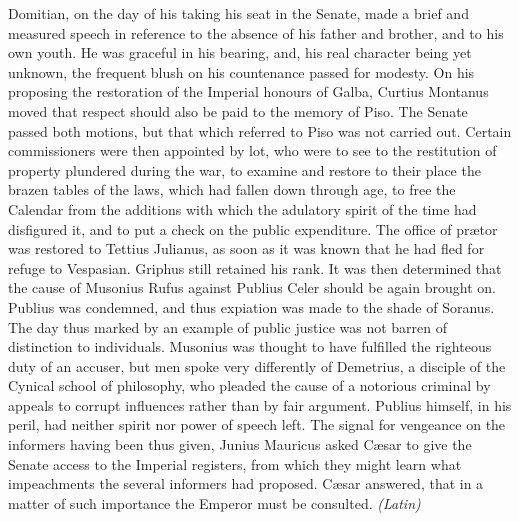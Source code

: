 Domitian, on the day of his taking his seat in the Senate, made a brief and measured speech in reference to the absence of his father and brother, and to his own youth. He was graceful in his bearing, and, his real character being yet unknown, the frequent blush on his countenance passed for modesty. On his proposing the restoration of the Imperial honours of Galba, Curtius Montanus moved that respect should also be paid to the memory of Piso. The Senate passed both motions, but that which referred to Piso was not carried out. Certain commissioners were then appointed by lot, who were to see to the restitution of property plundered during the war, to examine and restore to their place the brazen tables of the laws, which had fallen down through age, to free the Calendar from the additions with which the adulatory spirit of the time had disfigured it, and to put a check on the public expenditure. The office of prætor was restored to Tettius Julianus, as soon as it was known that he had fled for refuge to Vespasian. Griphus still retained his rank. It was then determined that the cause of Musonius Rufus against Publius Celer should be again brought on. Publius was condemned, and thus expiation was made to the shade of Soranus. The day thus marked by an example of public justice was not barren of distinction to individuals. Musonius was thought to have fulfilled the righteous duty of an accuser, but men spoke very differently of Demetrius, a disciple of the Cynical school of philosophy, who pleaded the cause of a notorious criminal by appeals to corrupt influences rather than by fair argument. Publius himself, in his peril, had neither spirit nor power of speech left. The signal for vengeance on the informers having been thus given, Junius Mauricus asked Cæsar to give the Senate access to the Imperial registers, from which they might learn what impeachments the several informers had proposed. Cæsar answered, that in a matter of such importance the Emperor must be consulted. \emph{(Latin)}



